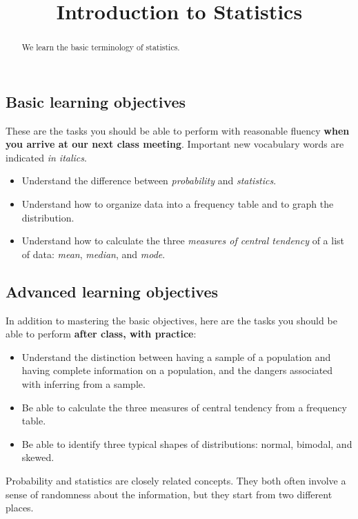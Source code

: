 \documentclass{ximera}
\title{Introduction to Statistics}
\begin{document}
\begin{abstract}
We learn the basic terminology of statistics.
\end{abstract}
\maketitle

\subsection*{Basic learning objectives}

These are the tasks you should be able to perform with reasonable fluency \textbf{when you arrive at our next class meeting}. Important new vocabulary words are indicated \emph{in italics}. 

\begin{itemize}
    \item Understand the difference between \emph{probability} and \emph{statistics}.
    \item Understand how to organize data into a frequency table and to graph the distribution.
	\item Understand how to calculate the three \emph{measures of central tendency} of a list of data: \emph{mean}, \emph{median}, and \emph{mode}.
\end{itemize}

\subsection*{Advanced learning objectives}

In addition to mastering the basic objectives, here are the tasks you should be able to perform \textbf{after class, with practice}: 

\begin{itemize}
	\item Understand the distinction between having a sample of a population and having complete information on a population, and the dangers associated with inferring from a sample.
	\item Be able to calculate the three measures of central tendency from a frequency table.
    \item Be able to identify three typical shapes of distributions: normal, bimodal, and skewed.
\end{itemize}

\noindent\hrulefill

Probability and statistics are closely related concepts. They both often involve a sense of randomness about the information, but they start from two different places.
\end{document}
